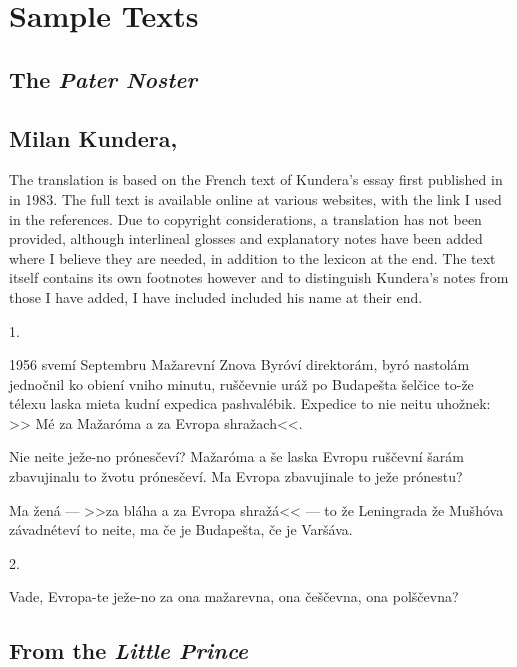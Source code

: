 \chapter{Sample Texts}

\section{The \emph{Pater Noster}}

\section{Milan Kundera, }

{\small
The translation is based on the French text of Kundera's essay  first published in  in 1983. The full text is available online at various websites, with the link I used in the references. Due to copyright considerations, a translation has not been provided, although interlineal glosses and explanatory notes have been added where  I believe they are needed, in addition to the lexicon at the end. The text itself contains its own footnotes however and to distinguish Kundera's notes from those I have added, I have included included his name at their end.
}

\begin{center}1.\end{center}

1956 svemí Septembru Mažarevní Znova Byróví direktorám, byró
nastolám jednočnil ko obiení vniho minutu, ruščevnie uráž
po Budapešta šelčice to-že télexu laska mieta kudní expedica
pashvalébik. Expedice to nie neitu uhožnek: >> Mé za Mažaróma a
za Evropa shražach<<.

Nie neite ježe-no prónesčeví? Mažaróma a še laska Evropu ruščevní šarám zbavujinalu to žvotu prónesčeví. Ma Evropa zbavujinale to ježe prónestu?

Ma žená --- >>za bláha a za Evropa shražá<< --- to že Leningrada že Mušhóva závadnéteví to neite, ma če je Budapešta, če je Varšáva.

\begin{center}2.\end{center}
Vade, Evropa-te ježe-no za ona mažarevna, ona češčevna, ona polščevna?


\section{From the \emph{Little Prince}}


